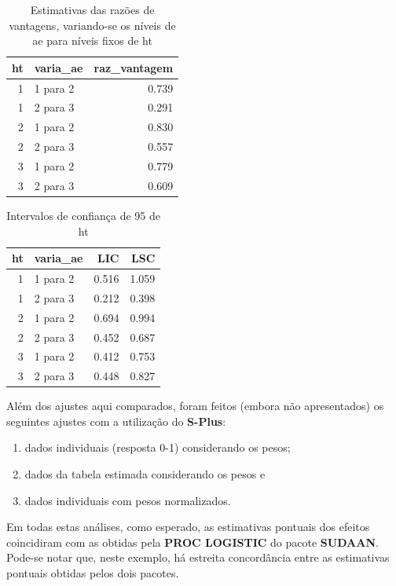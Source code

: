 \documentclass[]{book}
\theoremstyle{definition}
\theoremstyle{definition}
\theoremstyle{definition}
\theoremstyle{remark}
\begin{document}
\begin{table}

\caption{\label{tab:razvant}Estimativas das razões de vantagens, variando-se os níveis de ae para níveis fixos
  de ht}
\centering
\begin{tabular}[t]{rlr}
\toprule
ht & varia\_ae & raz\_vantagem\\
\midrule
1 & 1 para 2 & 0.739\\
1 & 2 para 3 & 0.291\\
2 & 1 para 2 & 0.830\\
2 & 2 para 3 & 0.557\\
3 & 1 para 2 & 0.779\\
3 & 2 para 3 & 0.609\\
\bottomrule
\end{tabular}
\end{table}

\begin{table}

\caption{\label{tab:icvant}Intervalos de confiança de 95%
  de ht}
\centering
\begin{tabular}[t]{rlrr}
\toprule
ht & varia\_ae & LIC & LSC\\
\midrule
1 & 1 para 2 & 0.516 & 1.059\\
1 & 2 para 3 & 0.212 & 0.398\\
2 & 1 para 2 & 0.694 & 0.994\\
2 & 2 para 3 & 0.452 & 0.687\\
3 & 1 para 2 & 0.412 & 0.753\\
3 & 2 para 3 & 0.448 & 0.827\\
\bottomrule
\end{tabular}
\end{table}

Além dos ajustes aqui comparados, foram feitos (embora não apresentados)
os seguintes ajustes com a utilização do \textbf{S-Plus}:

\begin{enumerate}
\def\labelenumi{\arabic{enumi})}
\item
  dados individuais (resposta 0-1) considerando os pesos;
\item
  dados da tabela estimada considerando os pesos e
\item
  dados individuais com pesos normalizados.
\end{enumerate}

Em todas estas análises, como esperado, as estimativas pontuais dos
efeitos coincidiram com as obtidas pela \textbf{PROC LOGISTIC} do pacote
\textbf{SUDAAN}. Pode-se notar que, neste exemplo, há estreita
concordância entre as estimativas pontuais obtidas pelos dois pacotes.
\end{document}
